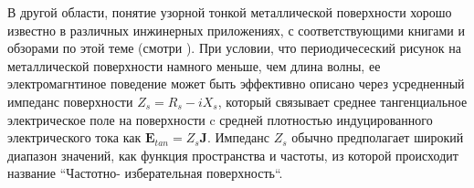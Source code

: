 \documentclass[12pt,a4paper]{article}
\begin{document}
В другой области, понятие узорной тонкой металлической поверхности хорошо известно
в различных инжинерных приложениях, с соответствующими книгами и обзорами по этой
теме (смотри \cite{14}). При условии, что периодичесеский рисунок на металлической
поверхности намного меньше, чем длина волны, ее электромагнтиное поведение может
быть эффективно описано через усредненный импеданс поверхности $Z_s = R_s - iX_s$,
который связывает среднее тангенциальное электрическое поле на поверхности c 
средней плотностью индуцированного электрического тока как $\textbf{E}_{tan}=
Z_s\textbf{J}$. Импеданс $Z_s$ обычно предполагает широкий диапазон значений, как
функция пространства и частоты, из которой происходит название ``Частотно-
изберательная поверхность``.
\end{document}
